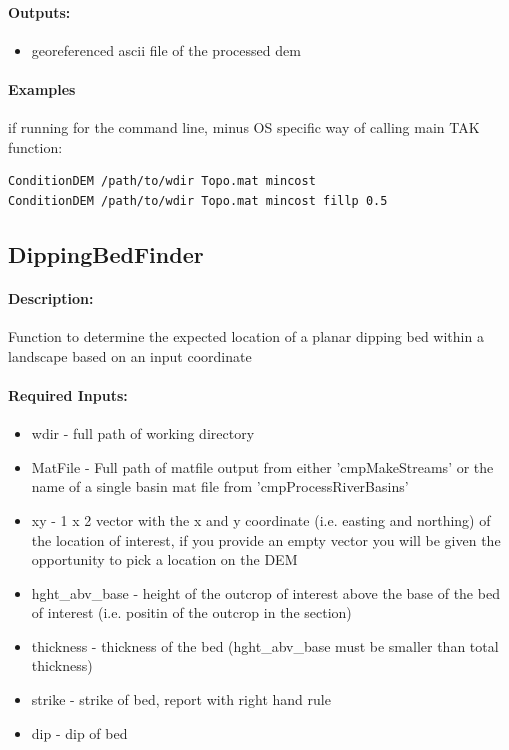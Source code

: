 \paragraph{Outputs:}
\begin{itemize}
\item georeferenced ascii file of the processed dem
\end{itemize}

\paragraph{Examples} if running for the command line, minus OS specific way of calling main TAK function:
\begin{lstlisting}[language=bash]
ConditionDEM /path/to/wdir Topo.mat mincost
ConditionDEM /path/to/wdir Topo.mat mincost fillp 0.5
\end{lstlisting}

\subsection{DippingBedFinder}
\paragraph{Description:}
Function to determine the expected location of a planar dipping bed within a landscape based on an input coordinate

\paragraph{Required Inputs:}
\begin{itemize}
\item wdir - full path of working directory
\item MatFile - Full path of matfile output from either 'cmpMakeStreams' or the name of a single basin mat file from 'cmpProcessRiverBasins'
\item xy - 1 x 2 vector with the x and y coordinate (i.e. easting and northing) of the location of interest, if you provide an empty vector
you will be given the opportunity to pick a location on the DEM
\item hght\_abv\_base - height of the outcrop of interest above the base of the bed of interest (i.e. positin of the outcrop in the section)
\item thickness - thickness of the bed (hght\_abv\_base must be smaller than total thickness)
\item strike - strike of bed, report with right hand rule
\item dip - dip of bed
\end{itemize}


